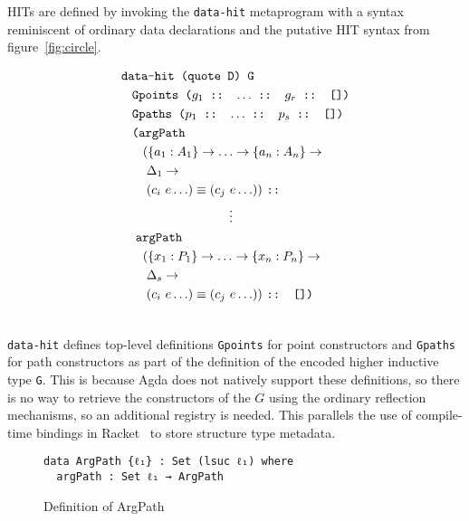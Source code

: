 \documentclass[sigplan,10pt]{acmart}
\begin{document}
HITs are defined by invoking the \texttt{data-hit} metaprogram with a syntax reminiscent of ordinary data declarations and the putative HIT syntax from figure~\ref{fig:circle}.

\begin{align*}
& \texttt{data-hit (quote D) G}\\
  & \hspace {0.3cm} \texttt{Gpoints ($g_1$ :: $\ldots$ :: $g_r$ :: [])} \\
  & \hspace {0.3cm} \texttt{Gpaths ($p_1$ :: $\ldots$ :: $p_s$ :: [])} \\
  & \hspace {0.3cm} \texttt{(argPath} \\
  & \hspace {0.6cm} (\{a_1:A_1\} \rightarrow \ldots \rightarrow \{a_n:A_n\} \rightarrow \\
  & \hspace {0.7cm} \Delta_1 \rightarrow \\
  & \hspace {0.7cm} (c_i\ e \ldots) \equiv (c_j\ e \ldots))\ \texttt{::} \\
  & \hspace {3cm} \vdots \\
  & \hspace {0.4cm} \texttt{argPath} \\
  & \hspace {0.6cm} (\{x_1:P_1\} \rightarrow \ldots \rightarrow \{x_n:P_n\} \rightarrow \\
  & \hspace {0.7cm} \Delta_s \rightarrow \\
  & \hspace {0.7cm} (c_i\ e \ldots) \equiv (c_j\ e \ldots))\ \texttt{:: [])}\\ \nonumber
\end{align*}


\texttt{data-hit} defines top-level definitions \texttt{Gpoints} for point constructors and \texttt{Gpaths} for path constructors as part of the definition of the encoded higher inductive type \texttt{G}.
This is because Agda does not natively support these definitions, so there is no way to retrieve the constructors of the $G$ using the ordinary reflection mechanisms, so an additional registry is needed.
This parallels the use of compile-time bindings in Racket~\citep{compilemacro} to store structure type metadata.

\begin{figure}
\begin{center}
\begin{BVerbatim}
data ArgPath {ℓ₁} : Set (lsuc ℓ₁) where
  argPath : Set ℓ₁ → ArgPath
\end{BVerbatim}
\end{center}
\caption{Definition of ArgPath}
\label{fig:argPath}
\end{figure}
\end{document}
